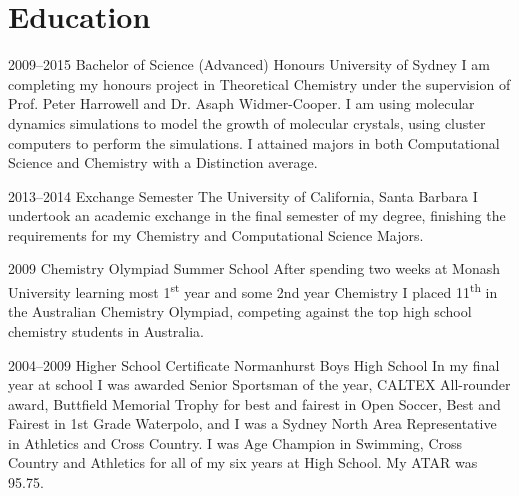 \documentclass{friggeri-cv} %
\begin{document}

\section{Education}

\begin{entrylist}


\entry
{2009--2015}
{Bachelor of Science (Advanced) Honours}
{University of Sydney}
{I am completing my honours project in Theoretical Chemistry under the supervision of Prof. Peter Harrowell and Dr. Asaph Widmer-Cooper. I am using molecular dynamics simulations to model the growth of molecular crystals, using cluster computers to perform the simulations. I attained majors in both Computational Science and Chemistry with a Distinction average.
}


\entry
{2013--2014}
{Exchange Semester}
{The University of California, Santa Barbara}
{I undertook an academic exchange in the final semester of my degree, finishing the requirements for my Chemistry and Computational Science Majors.}


\entry
{2009}
{Chemistry Olympiad Summer School}
{}
{After spending two weeks at Monash University learning most 1\textsuperscript{st} year and some 2nd year Chemistry I placed 11\textsuperscript{th} in the Australian Chemistry Olympiad, competing against the top high school chemistry students in Australia.}

\entry
{2004--2009}
{Higher School Certificate}
{Normanhurst Boys High School}
{In my final year at school I was awarded Senior Sportsman of the year, CALTEX All-rounder award, Buttfield Memorial Trophy for best and fairest in Open Soccer, Best and Fairest in 1st Grade Waterpolo, and I was a Sydney North Area Representative in Athletics and Cross Country. I was Age Champion in Swimming, Cross Country and Athletics for all of my six years at High School. My ATAR was 95.75.
}


\end{entrylist}


\end{document}
